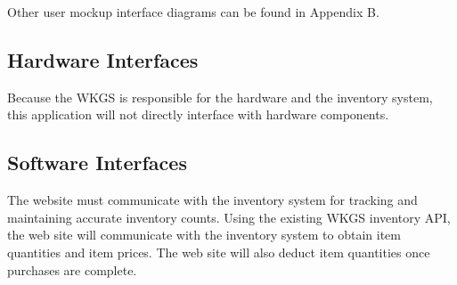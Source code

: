 \documentclass{scrreprt}
\theoremstyle{funreq}
\begin{document}
Other user mockup interface diagrams can be found in Appendix B.


\subsection{Hardware Interfaces}
Because the WKGS is responsible for the hardware and the inventory system, this application will not directly interface with hardware components. 

\subsection{Software Interfaces}
The website must communicate with the inventory system for tracking and maintaining accurate inventory counts.  Using the existing WKGS inventory API, the web site will communicate with the inventory system to obtain item quantities and item prices.  The web site will also deduct item quantities once purchases are complete. 


\end{document}
